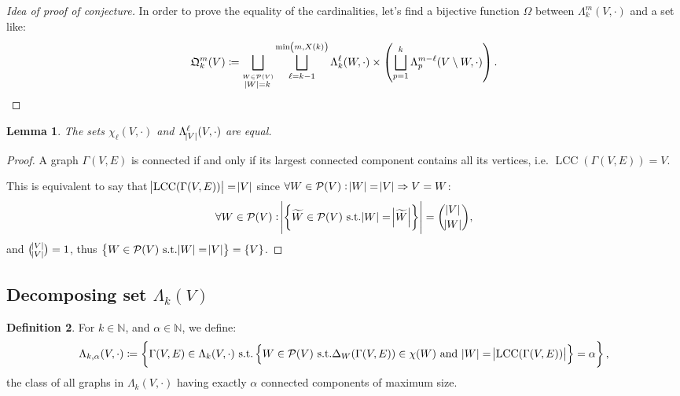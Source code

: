 \documentclass{article}
\newtheorem{lemma}{Lemma}[section]
\theoremstyle{definition}
\newtheorem{definition}[lemma]{Definition}
\theoremstyle{remark}
\DeclareMathOperator{\LCC}{LCC}
\newcommand{\N}{\mathbb N}
\newcommand{\st}{\text{ s.t.}}
\begin{document}
	\begin{proof}[Idea of proof of conjecture] In order to prove the equality of the cardinalities, let's find a bijective function $\Omega$ between
	$\Lambda_k^m(V, \cdot)$ and a set like:
	\[\mathfrak Q_k^m(V) \coloneqq \bigsqcup_{\stackrel {W \in \mathcal P(V)}{\abs W = k}}\bigsqcup_{\ell=k-1}^{\min\left(m, X(k)\right)}
		\Lambda_k^\ell(W, \cdot) \times \left(\bigsqcup_{p=1}^k \Lambda_p^{m-\ell}(V \setminus W, \cdot)\right).\]

	\end{proof}

	\begin{lemma} The sets $\chi_\ell(V, \cdot)$ and $\Lambda_{\abs V}^\ell(V, \cdot)$ are equal.
	\end{lemma}

	\begin{proof} A graph $\Gamma(V, E)$ is connected if and only if its largest connected component contains all its vertices, i.e. $\LCC(\Gamma(V, E)) = V$.

	This is equivalent to say that $\abs {\LCC(\Gamma(V, E))} = \abs V$ since $\forall W \in \mathcal P(V) : \abs W = \abs V \Rightarrow V = W$:
	\[\forall W \in \mathcal P(V) : \abs {\left\{\widetilde W \in \mathcal P(V) \st \abs W = \abs {\widetilde W}\right\}} = \binom {\abs V}{\abs W},\]
	and $\binom {\abs V}{\abs V} = 1$, thus $\left\{W \in \mathcal P(V) \st \abs W = \abs V\right\} = \{V\}$.
	\end{proof}

	\subsection{Decomposing set $\Lambda_k(V)$}
		\begin{definition} For $k \in \N$, and $\alpha \in \N$, we define:
		\[\Lambda_{k,\alpha}(V, \cdot) \coloneqq \left\{\Gamma(V, E) \in \Lambda_k(V, \cdot) \st
			\left\{W \in \mathcal P(V) \st \Delta_W(\Gamma(V, E)) \in \chi(W) \text{ and } \abs W = \abs {\LCC(\Gamma(V, E))}\right\} = \alpha\right\},\]
		the class of all graphs in $\Lambda_k(V, \cdot)$ having exactly $\alpha$ connected components of maximum size.
		\end{definition}
\end{document}

